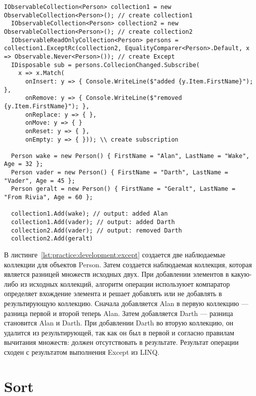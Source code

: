 \begin{lstlisting}[style=csharpinlinestyle, caption={Пример использования Except}, label=lst:practice:development:except]
  IObservableCollection<Person> collection1 = new ObservableCollection<Person>(); // create collection1
  IObservableCollection<Person> collection2 = new ObservableCollection<Person>(); // create collection2
  IObservableReadOnlyCollection<Person> persons = collection1.ExceptRc(collection2, EqualityComparer<Person>.Default, x => Observable.Never<Person>()); // create Except
  IDisposable sub = persons.CollecionChanged.Subscribe(
    x => x.Match(
      onInsert: y => { Console.WriteLine($"added {y.Item.FirstName}"); },
      onRemove: y => { Console.WriteLine($"removed {y.Item.FirstName}"); },
      onReplace: y => { },
      onMove: y => { }
      onReset: y => { },
      onEmpty: y => { })); \\ create subscription

  Person wake = new Person() { FirstName = "Alan", LastName = "Wake", Age = 32 };
  Person vader = new Person() { FirstName = "Darth", LastName = "Vader", Age = 45 };
  Person geralt = new Person() { FirstName = "Geralt", LastName = "From Rivia", Age = 60 };

  collection1.Add(wake); // output: added Alan
  collection1.Add(vader); // output: added Darth
  collection2.Add(vader); // output: removed Darth
  collection2.Add(geralt)
\end{lstlisting}

В листинге~\ref{lst:practice:development:except} создается две наблюдаемые коллекции для объектов Person. Затем создается наблюдаемая коллекция, которая является разницей множеств исходных двух.
При добавлении элементов в какую-либо из исходных коллекций, алгоритм операции используюет компаратор определяет вхождение элемента и решает добавлять или не добавлять в результирующую коллекцию.
Сначала добавляется Alan в первую коллекцию --- разница первой и второй теперь Alan. Затем добавляется Darth --- разница становится Alan и Darth.
При добавлении Darth во вторую коллекцию, он удалится из результирующей, так как он был в первой и согласно правилам вычитания множеств: должен отсутствовать в результате.
Результат операции сходен с результатом выполнения Except из LINQ.

\section{Sort}
\label{sub:development:sort}

